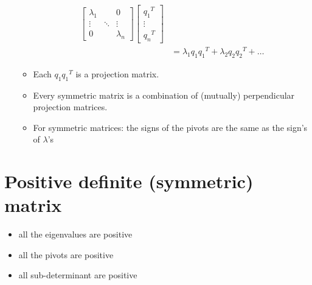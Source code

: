 \documentclass[a4paper,12pt]{article}
\theoremstyle{definition} \newtheorem{Theorem}{Theorem}
\begin{document}
\begin{enumerate}
\begin{itemize}
\begin{align*}
				\begin{bmatrix}
					\lambda_1 &        & 0      \\
					\vdots    & \ddots & \vdots \\
					0         &        & \lambda_n 
				\end{bmatrix}
				\begin{bmatrix}
					{q_1}^T       \\
					\vdots \\
					{q_n}^T 
				\end{bmatrix} \\
	&= \lambda_1 q_1 {q_1}^T + \lambda_2 q_2 {q_2}^T + \ldots
	\end{align*}
	
	\item Each $q_1 {q_1}^T$ is a projection matrix.
	\item Every symmetric matrix is a combination of (mutually) perpendicular projection matrices.
	\item For symmetric matrices: the signs of the pivots are the same as the sign's of $\lambda$'s
\end{itemize}
\end{enumerate}

\section{Positive definite (symmetric) matrix }
\begin{itemize}
	\item all the eigenvalues are positive
	\item all the pivots are positive
	\item all sub-determinant are positive 
\end{itemize}
\end{document}
